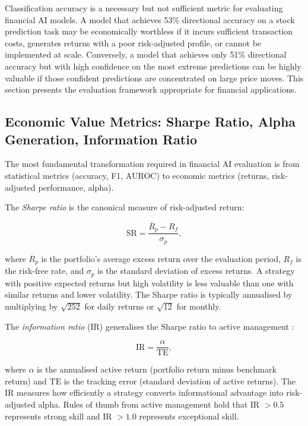 Classification accuracy is a necessary but not sufficient metric for evaluating
financial AI models. A model that achieves 53\% directional accuracy on a stock
prediction task may be economically worthless if it incurs sufficient transaction costs,
generates returns with a poor risk-adjusted profile, or cannot be implemented at scale.
Conversely, a model that achieves only 51\% directional accuracy but with high
confidence on the most extreme predictions can be highly valuable if those confident
predictions are concentrated on large price moves. This section presents the evaluation
framework appropriate for financial applications.

\subsection{Economic Value Metrics: Sharpe Ratio, Alpha Generation, Information Ratio}
\label{sec:ch13-economic-value-metrics}

The most fundamental transformation required in financial AI evaluation is from
statistical metrics (accuracy, F1, AUROC) to economic metrics (returns, risk-adjusted
performance, alpha).

The \emph{Sharpe ratio} \cite{sharpe1994sharpe} is the canonical measure of
risk-adjusted return:

\begin{equation}
  \text{SR} = \frac{\overline{R}_p - R_f}{\sigma_p},
  \label{eq:ch13-sharpe-ratio}
\end{equation}

where $\overline{R}_p$ is the portfolio's average excess return over the evaluation
period, $R_f$ is the risk-free rate, and $\sigma_p$ is the standard deviation of excess
returns. A strategy with positive expected returns but high volatility is less valuable
than one with similar returns and lower volatility. The Sharpe ratio is typically
annualised by multiplying by $\sqrt{252}$ for daily returns or $\sqrt{12}$ for monthly.

The \emph{information ratio} (IR) generalises the Sharpe ratio to active management
\cite{grinold1999active}:

\begin{equation}
  \text{IR} = \frac{\alpha}{\text{TE}},
  \label{eq:ch13-information-ratio}
\end{equation}

where $\alpha$ is the annualised active return (portfolio return minus benchmark return)
and $\text{TE}$ is the tracking error (standard deviation of active returns). The IR
measures how efficiently a strategy converts informational advantage into
risk-adjusted alpha. Rules of thumb from active management hold that IR $> 0.5$
represents strong skill and IR $> 1.0$ represents exceptional skill.

